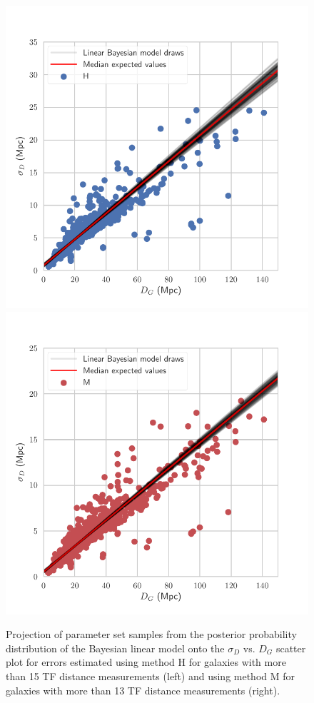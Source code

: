 \documentclass[a4paper,fleqn,usenatbib]{mnras}
\begin{document}
\begin{figure}
	\includegraphics[scale=0.69]{drawsl}
	\includegraphics[scale=0.69]{drawsl2}
    \caption{Projection of parameter set samples from the posterior probability distribution of the Bayesian linear model onto the $\sigma_D$ vs. $D_G$ scatter plot for errors estimated using method H for galaxies with more than 15 TF distance measurements (left) and using method M for galaxies with more than 13 TF distance measurements (right).}
    \label{fig:drawsl}
\end{figure}
\end{document}

